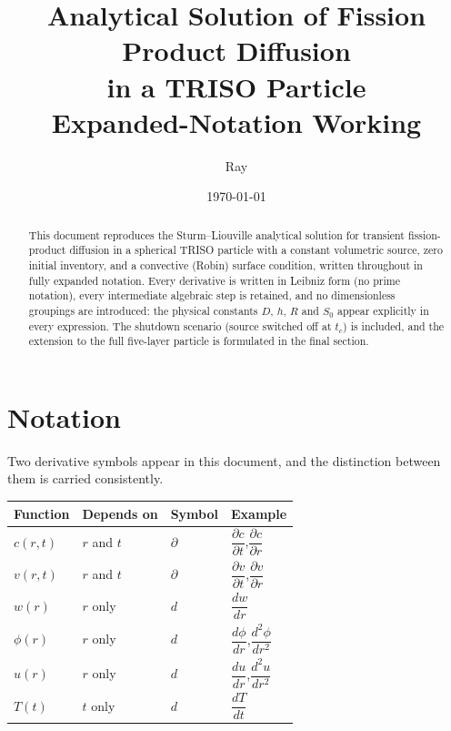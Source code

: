 \documentclass[11pt,a4paper]{article}
\title{Analytical Solution of Fission Product Diffusion\\
in a TRISO Particle\\[0.4em]
\large Expanded-Notation Working}
\author{Ray}
\date{\today}
\begin{document}
\maketitle

\begin{abstract}
This document reproduces the Sturm--Liouville analytical solution for transient
fission-product diffusion in a spherical TRISO particle with a constant volumetric
source, zero initial inventory, and a convective (Robin) surface condition, written
throughout in fully expanded notation. Every derivative is written in Leibniz form
(no prime notation), every intermediate algebraic step is retained, and no
dimensionless groupings are introduced: the physical constants $D$, $h$, $R$ and
$S_{0}$ appear explicitly in every expression. The shutdown scenario (source
switched off at $t_{c}$) is included, and the extension to the full five-layer
particle is formulated in the final section.
\end{abstract}

\tableofcontents

\section{Notation}

Two derivative symbols appear in this document, and the distinction between them is
carried consistently.

\begin{center}
\begin{tabular}{llll}
\hline
Function & Depends on & Symbol & Example \\
\hline
$c(r,t)$   & $r$ and $t$ & $\partial$ & $\dfrac{\partial c}{\partial t}$,\quad $\dfrac{\partial c}{\partial r}$ \\[0.9em]
$v(r,t)$   & $r$ and $t$ & $\partial$ & $\dfrac{\partial v}{\partial t}$,\quad $\dfrac{\partial v}{\partial r}$ \\[0.9em]
$w(r)$     & $r$ only    & $d$        & $\dfrac{dw}{dr}$ \\[0.9em]
$\phi(r)$  & $r$ only    & $d$        & $\dfrac{d\phi}{dr}$,\quad $\dfrac{d^{2}\phi}{dr^{2}}$ \\[0.9em]
$u(r)$     & $r$ only    & $d$        & $\dfrac{du}{dr}$,\quad $\dfrac{d^{2}u}{dr^{2}}$ \\[0.9em]
$T(t)$     & $t$ only    & $d$        & $\dfrac{dT}{dt}$ \\
\hline
\end{tabular}
\end{center}
\end{document}
